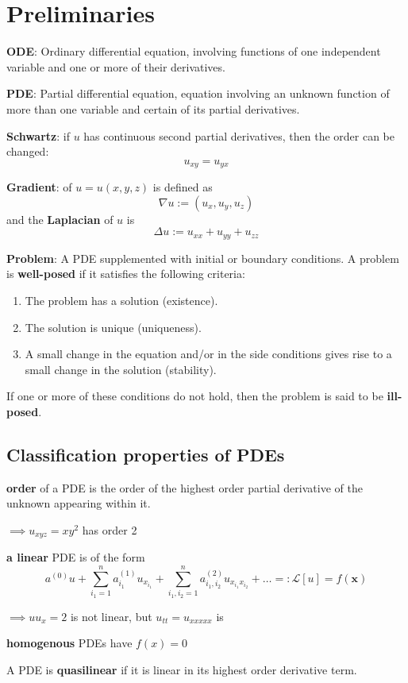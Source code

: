 \section{Preliminaries}
\textbf{ODE}: Ordinary differential equation, involving functions of one independent variable and one or more of their derivatives.

\textbf{PDE}: Partial differential equation, equation involving an unknown function of more than one variable and certain of its partial derivatives.

\textbf{Schwartz}: if $u$ has continuous second partial derivatives, then the order can be changed:
$$u_{xy} = u_{yx}$$

\textbf{Gradient}: of $u = u(x, y, z)$ is defined as
$$\nabla u := (u_x, u_y, u_z)$$
and the \textbf{Laplacian} of $u$ is
$$\Delta u := u_{xx} + u_{yy} + u_{zz}$$

\textbf{Problem}: A PDE supplemented with initial or boundary conditions. A problem is \textbf{well-posed} if it satisfies the following criteria:
\begin{enumerate}
  \item The problem has a solution (existence).
  \item The solution is unique (uniqueness).
  \item A small change in the equation and/or in the side conditions gives rise to a small change in the solution (stability).
\end{enumerate}
If one or more of these conditions do not hold, then the problem is said to be \textbf{ill-posed}.

\subsection{Classification properties of PDEs}
\textbf{order} of a PDE is the order of the highest order partial derivative of the unknown appearing within it.

$\implies u_{xyz} = xy^2$ has order 2 

\textbf{a linear} PDE is of the form
$$
a^{(0)}u + \sum_{i_1=1}^n a^{(1)}_{i_1} u_{x_{i_1}}
+ \sum_{i_1,i_2=1}^n a^{(2)}_{i_1,i_2} u_{x_{i_1}x_{i_2}} + \dots
=:\mathcal{L}[u] = f(\mathbf{x})
$$

$\implies uu_x=2$ is not linear, but $u_{tt} = u_{xxxxx}$ is

\textbf{homogenous} PDEs have $f(x)=0$

A PDE is \textbf{quasilinear} if it is linear in its highest order derivative term.

